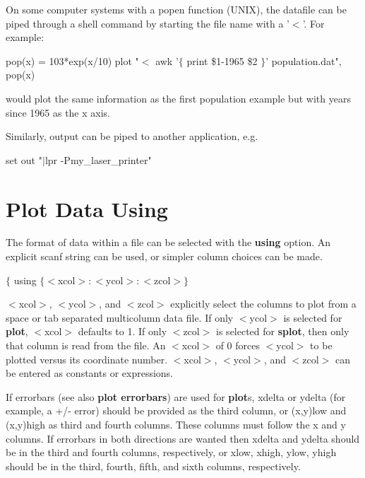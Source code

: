 On some computer systems with a popen function (UNIX), the datafile
can be piped through a shell command by starting the file name
with a '$<$'.  For example:

        pop(x) = 103*exp(x/10)
        plot "$<$ awk '$\{$ print \$1-1965 \$2 $\}$' population.dat", pop(x)

would plot the same information as the first population example
but with years since 1965 as the x axis.

Similarly, output can be piped to another application, e.g.

        set out "$|$lpr -Pmy\_laser\_printer"

\section{Plot Data Using}
The format of data within a file can be selected with the {\bf using}
option. An explicit scanf string can be used, or simpler column
choices can be made.


{$\{$ using $\{ <$xcol$>:<$ycol$>:<$zcol$> \}$}

$<$xcol$>$, $<$ycol$>$, and $<$zcol$>$ explicitly select the columns to plot from
a space or tab separated multicolumn data file. If only $<$ycol$>$ is
selected for {\bf plot}, $<$xcol$>$ defaults to 1. If only $<$zcol$>$ is selected
for {\bf splot}, then only that column is read from the file. An $<$xcol$>$ of
0 forces $<$ycol$>$ to be plotted versus its coordinate number. $<$xcol$>$,
$<$ycol$>$, and $<$zcol$>$ can be entered as constants or expressions.

If errorbars (see also {\bf plot errorbars}) are used for {\bf plot}s,
xdelta or ydelta (for example, a +/- error) should be provided as the third
column, or (x,y)low and (x,y)high as third and fourth columns.  These columns
must follow the x and y columns. If errorbars in both directions are wanted
then xdelta and ydelta should be in the third and fourth columns, respectively,
or xlow, xhigh, ylow, yhigh should be in the third, fourth, fifth, and sixth
columns, respectively.

